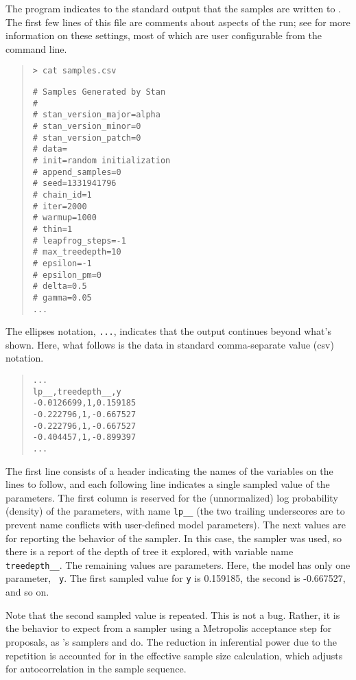 The program indicates to the standard output that the samples are
written to .  The first few lines of this file are
comments about aspects of the run; see  for more
information on these settings, most of which are user configurable
from the command line.
%
\begin{quote}
\begin{Verbatim}[fontshape=sl]
> cat samples.csv
\end{Verbatim}
\begin{Verbatim}
# Samples Generated by Stan
#
# stan_version_major=alpha
# stan_version_minor=0
# stan_version_patch=0
# data=
# init=random initialization
# append_samples=0
# seed=1331941796
# chain_id=1
# iter=2000
# warmup=1000
# thin=1
# leapfrog_steps=-1
# max_treedepth=10
# epsilon=-1
# epsilon_pm=0
# delta=0.5
# gamma=0.05
...
\end{Verbatim}
\end{quote}
%
The ellipses notation, {\tt ...}, indicates that the output continues
beyond what's shown.  Here, what follows is the data in standard
comma-separate value ({\sc csv}) notation.
%
\begin{quote}
\begin{Verbatim}
...
lp__,treedepth__,y
-0.0126699,1,0.159185
-0.222796,1,-0.667527
-0.222796,1,-0.667527
-0.404457,1,-0.899397
...
\end{Verbatim}
\end{quote}
%
The first line consists of a header indicating the names of the
variables on the lines to follow, and each following line indicates a
single sampled value of the parameters.  The first column is reserved
for the (unnormalized) log probability (density) of the parameters,
with name {\tt lp\_\_} (the two trailing underscores are to prevent
name conflicts with user-defined model parameters).  The next values
are for reporting the behavior of the sampler.  In this case, the
\NUTS sampler was used, so there is a report of the depth of tree it
explored, with variable name {\tt treedepth\_\_}.  The remaining
values are parameters.  Here, the model has only one parameter, {\tt
  y}.  The first sampled value for {\tt y} is 0.159185, the second is
-0.667527, and so on.

Note that the second sampled value is repeated.  This is not a bug.
Rather, it is the behavior to expect from a sampler using a Metropolis
acceptance step for proposals, as \Stan's samplers \HMC and \NUTS do.
The reduction in inferential power due to the repetition is accounted
for in the effective sample size calculation, which adjusts for
autocorrelation in the sample sequence.

